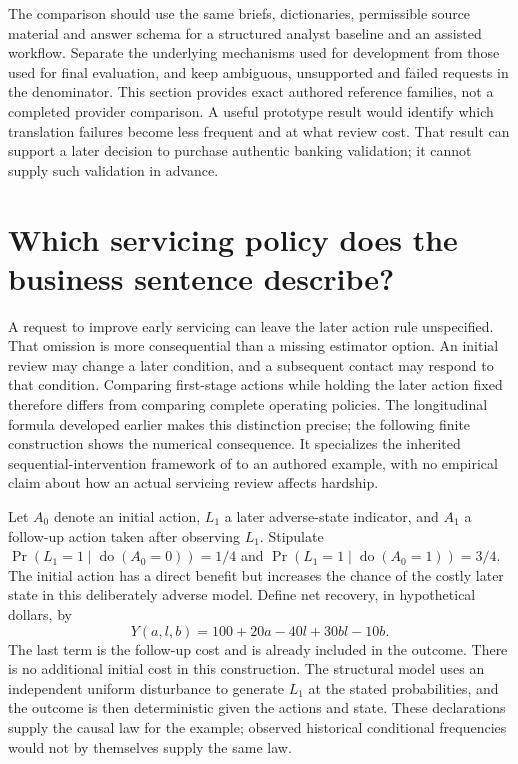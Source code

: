 The comparison should use the same briefs, dictionaries, permissible source
material and answer schema for a structured analyst baseline and an assisted
workflow. Separate the underlying mechanisms used for development from those
used for final evaluation, and keep ambiguous, unsupported and failed requests
in the denominator. This section provides exact authored reference families,
not a completed provider comparison. A useful prototype result would identify
which translation failures become less frequent and at what review cost.
That result can support a later decision to purchase authentic banking
validation; it cannot supply such validation in advance.
\label{exec17:l2-monetary-end}


\section{Which servicing policy does the business sentence describe?}
\label{exec17:l2-policy}

A request to improve early servicing can leave the later action rule
unspecified. That omission is more consequential than a missing estimator
option. An initial review may change a later condition, and a subsequent
contact may respond to that condition. Comparing first-stage actions while
holding the later action fixed therefore differs from comparing complete
operating policies. The longitudinal formula developed earlier makes this
distinction precise; the following finite construction shows the numerical
consequence. It specializes the inherited sequential-intervention framework
of \citet{hernan2020} to an authored example, with no empirical claim about
how an actual servicing review affects hardship.

Let $A_0$ denote an initial action, $L_1$ a later adverse-state indicator,
and $A_1$ a follow-up action taken after observing $L_1$. Stipulate
$\Pr(L_1=1\mid\operatorname{do}(A_0=0))=1/4$ and
$\Pr(L_1=1\mid\operatorname{do}(A_0=1))=3/4$. The initial action has a
direct benefit but increases the chance of the costly later state in this
deliberately adverse model. Define net recovery, in hypothetical dollars, by
\begin{equation}
 Y(a,l,b)=100+20a-40l+30bl-10b.
 \label{exec17:l2-sequential-reward}
\end{equation}
The last term is the follow-up cost and is already included in the outcome.
There is no additional initial cost in this construction. The structural
model uses an independent uniform disturbance to generate $L_1$ at the
stated probabilities, and the outcome is then deterministic given the
actions and state. These declarations supply the causal law for the example;
observed historical conditional frequencies would not by themselves supply
the same law.

